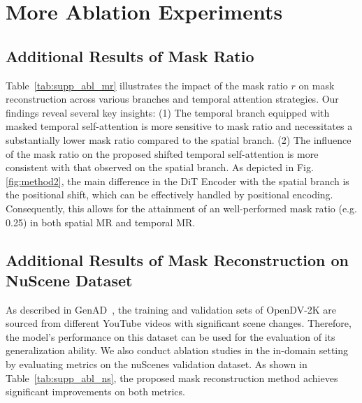 \clearpage
\setcounter{page}{1}
\maketitlesupplementary



\section{More Ablation Experiments}
\subsection{Additional Results of Mask Ratio}
\label{sec:supp_abl_mr}
Table~\ref{tab:supp_abl_mr} illustrates the impact of the mask ratio $r$ on mask reconstruction across various branches and temporal attention strategies. Our findings reveal several key insights: (1) The temporal branch equipped with masked temporal self-attention is more sensitive to mask ratio and necessitates a substantially lower mask ratio compared to the spatial branch. (2) The influence of the mask ratio on the proposed shifted temporal self-attention is more consistent with that observed on the spatial branch. As depicted in Fig.\ref{fig:method2}, the main difference in the DiT Encoder with the spatial branch is the positional shift, which can be effectively handled by positional encoding. Consequently, this allows for the attainment of an well-performed mask ratio (e.g. 0.25) in both spatial MR and temporal MR.


\subsection{Additional Results of Mask Reconstruction on NuScene Dataset}
As described in GenAD~\cite{genad}, the training and validation sets of OpenDV-2K are sourced from different YouTube videos with significant scene changes. Therefore, the model's performance on this dataset can be used for the evaluation of its generalization ability. We also conduct ablation studies in the in-domain setting by evaluating metrics on the nuScenes validation dataset. As shown in Table~\ref{tab:supp_abl_ns}, the proposed mask reconstruction method achieves significant improvements on both metrics.

